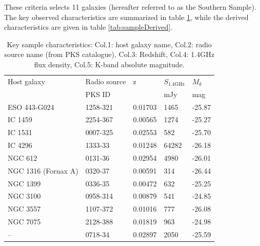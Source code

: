 	These criteria selects 11 galaxies (hereafter referred to as the Southern Sample). The key observed characteristics are summarized in table \ref{tab:sample}, while the derived characteristics are given in table \ref{tab:sampleDerived}.

	\begin{table}
		\centering
		\caption{Key sample characteristics: Col.1: host galaxy name, Col.2: radio source name (from PKS catalogue), Col.3: Redshift, Col.4: 1.4GHz flux density, Col.5: K-band absolute magnitude.}
		\label{tab:sample}
		\begin{tabular}{l l l l l}
			\hline
			\hline
			Host galaxy	& Radio source 	& z 		& $S_\text{1.4GHz}$	& $M_k$ \\
						& PKS ID 		& 			& mJy 				& mag \\
			\hline 
			ESO 443-G024 & 1258-321 	& 0.01703	& 1465 				& -25.87 \\ 
			IC 1459 	& 2254-367 		& 0.00565 	& 1274 				& -25.27 \\
			IC 1531 	& 0007-325 		& 0.02553 	& 582 				& -25.70 \\
			IC 4296		& 1333-33 		& 0.01248 	& 64282 			& -26.18 \\
			NGC 612 	& 0131-36 		& 0.02954 	& 4980 				& -26.01 \\ %
			NGC 1316 (Fornax A) & 0320-37 & 0.00591 & 314 				& -26.44 \\
			NGC 1399 	& 0336-35 		& 0.00472 	& 632 				& -25.25 \\
			NGC 3100 	& 0958-314 		& 0.00879 	& 541 				& -24.85 \\
			NGC 3557 	& 1107-372 		& 0.01016 	& 777 				& -26.08 \\
			NGC 7075 	& 2128-388 		& 0.01819 	& 963 				& -24.98 \\
			--			& 0718-34 		& 0.02897 	& 2050 				& -25.59 \\
			\hline
			\hline
		\end{tabular}
	\end{table}



